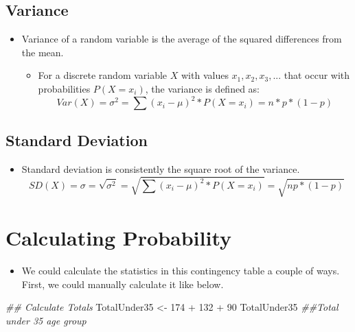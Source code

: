 \documentclass[
  letterpaper,
  DIV=11,
  numbers=noendperiod]{scrreprt}
\newenvironment{Shaded}{\begin{snugshade}}{\end{snugshade}}
\newcommand{\DecValTok}[1]{\textcolor[rgb]{0.68,0.00,0.00}{#1}}
\newcommand{\DocumentationTok}[1]{\textcolor[rgb]{0.37,0.37,0.37}{\textit{#1}}}
\newcommand{\NormalTok}[1]{\textcolor[rgb]{0.00,0.23,0.31}{#1}}
\newcommand{\OtherTok}[1]{\textcolor[rgb]{0.00,0.23,0.31}{#1}}
\newcommand{\SpecialCharTok}[1]{\textcolor[rgb]{0.37,0.37,0.37}{#1}}
\providecommand{\tightlist}{%
  \setlength{\itemsep}{0pt}\setlength{\parskip}{0pt}}\usepackage{longtable,booktabs,array}
\begin{document}
\subsection{Variance}\label{variance-1}

\begin{itemize}
\tightlist
\item
  Variance of a random variable is the average of the squared
  differences from the mean.

  \begin{itemize}
  \tightlist
  \item
    For a discrete random variable \(X\) with values
    \(x_1, x_2, x_3, ...\) that occur with probabilities \(P(X=x_i)\),
    the variance is defined as:
    \[Var(X) = \sigma^2 = \sum{(x_i-\mu)^2*P(X=x_i)} = n*p*(1-p)\]
  \end{itemize}
\end{itemize}

\subsection{Standard Deviation}\label{standard-deviation-1}

\begin{itemize}
\tightlist
\item
  Standard deviation is consistently the square root of the variance.
  \[SD(X) = \sigma = \sqrt{\sigma^2} = \sqrt{\sum{(x_i-\mu)^2*P(X=x_i)}}= \sqrt{np*(1-p)}\]
\end{itemize}

\section{Calculating Probability}\label{calculating-probability}

\begin{itemize}
\tightlist
\item
  We could calculate the statistics in this contingency table a couple
  of ways. First, we could manually calculate it like below.
\end{itemize}

\begin{Shaded}
\begin{Highlighting}[]
\DocumentationTok{\#\# Calculate Totals}
\NormalTok{TotalUnder35 }\OtherTok{\textless{}{-}} \DecValTok{174} \SpecialCharTok{+} \DecValTok{132} \SpecialCharTok{+} \DecValTok{90}
\NormalTok{TotalUnder35  }\DocumentationTok{\#\#Total under 35 age group}
\end{Highlighting}
\end{Shaded}
\end{document}
